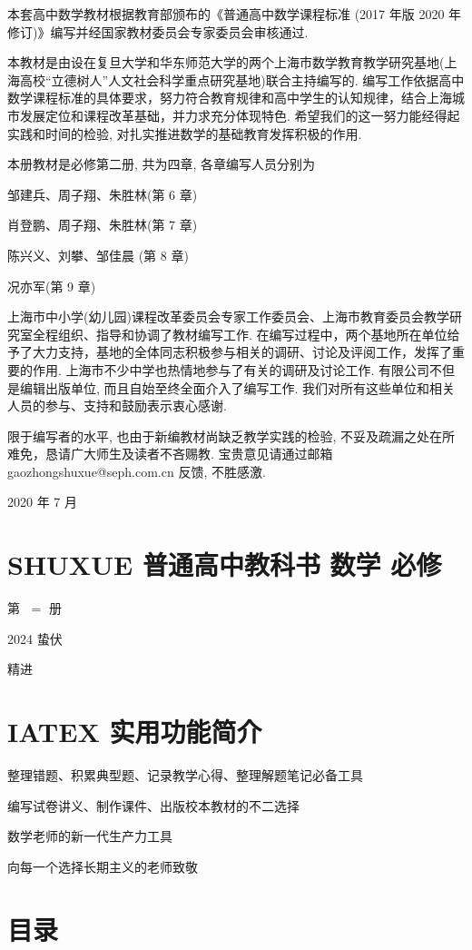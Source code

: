 \documentclass[10pt]{article}
\begin{document}
本套高中数学教材根据教育部颁布的《普通高中数学课程标准 (2017 年版 2020 年修订)》编写并经国家教材委员会专家委员会审核通过.

本教材是由设在复旦大学和华东师范大学的两个上海市数学教育教学研究基地(上海高校“立德树人”人文社会科学重点研究基地)联合主持编写的. 编写工作依据高中数学课程标准的具体要求，努力符合教育规律和高中学生的认知规律，结合上海城市发展定位和课程改革基础，并力求充分体现特色. 希望我们的这一努力能经得起实践和时间的检验, 对扎实推进数学的基础教育发挥积极的作用.

本册教材是必修第二册, 共为四章, 各章编写人员分别为

邹建兵、周子翔、朱胜林(第 6 章)

肖登鹏、周子翔、朱胜林(第 7 章)

陈兴义、刘攀、邹佳晨 (第 8 章)

况亦军(第 9 章)

上海市中小学(幼儿园)课程改革委员会专家工作委员会、上海市教育委员会教学研究室全程组织、指导和协调了教材编写工作. 在编写过程中，两个基地所在单位给予了大力支持，基地的全体同志积极参与相关的调研、讨论及评阅工作，发挥了重要的作用. 上海市不少中学也热情地参与了有关的调研及讨论工作. 有限公司不但是编辑出版单位, 而且自始至终全面介入了编写工作. 我们对所有这些单位和相关人员的参与、支持和鼓励表示衷心感谢.

限于编写者的水平, 也由于新编教材尚缺乏教学实践的检验, 不妥及疏漏之处在所难免，恳请广大师生及读者不吝赐教. 宝贵意见请通过邮箱 gaozhongshuxue@seph.com.cn 反馈, 不胜感激.

2020 年 7 月

\section*{SHUXUE 普通高中教科书 数学 必修}

第 \(\; =\) 册

2024 蛰伏

精进

\section*{IATEX 实用功能简介}

整理错题、积累典型题、记录教学心得、整理解题笔记必备工具

编写试卷讲义、制作课件、出版校本教材的不二选择

数学老师的新一代生产力工具

向每一个选择长期主义的老师致敬

\section*{目录}
\end{document}
